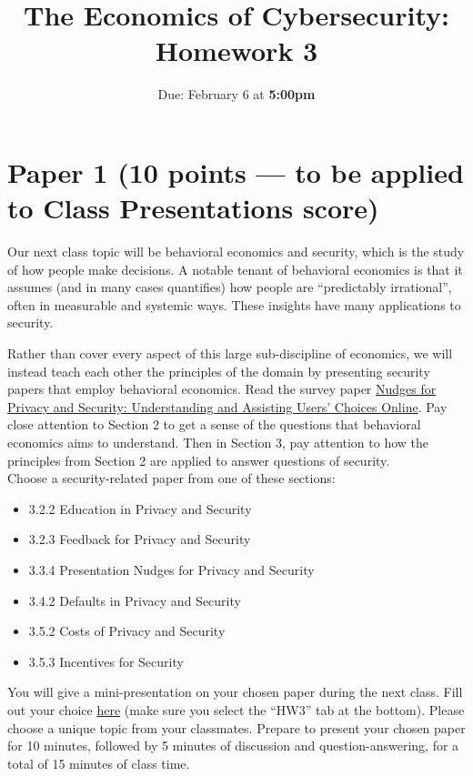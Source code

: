 \documentclass[11pt]{article}
\title{The Economics of Cybersecurity: Homework 3}
\date{Due: February 6 at {\bf 5:00pm}}
\author{}
\begin{document}
\maketitle


\section*{Paper 1 (10 points --- to be applied to Class Presentations score)}

Our next class topic will be behavioral economics and security, which is the study of how people make decisions. A notable tenant of behavioral economics is that it assumes (and in many cases quantifies) how people are ``predictably irrational'', often in measurable and systemic ways. These insights have many applications to security.

Rather than cover every aspect of this large sub-discipline of economics, we will instead teach each other the principles of the domain by presenting security papers that employ behavioral economics. Read the survey paper \href{https://dl.acm.org/doi/abs/10.1145/3054926}{Nudges for Privacy and Security: Understanding and Assisting Users' Choices Online}. Pay close attention to Section 2 to get a sense of the questions that behavioral economics aims to understand. Then in Section 3, pay attention to how the principles from Section 2 are applied to answer questions of security. 
\\ 

\noindent Choose a security-related paper from one of these sections:

\begin{itemize}
    \item 3.2.2 Education in Privacy and Security
    \item 3.2.3 Feedback for Privacy and Security
    \item 3.3.4 Presentation Nudges for Privacy and Security
    \item 3.4.2 Defaults in Privacy and Security
    \item 3.5.2 Costs of Privacy and Security
    \item 3.5.3 Incentives for Security
\end{itemize}


You will give a mini-presentation on your chosen paper during the next class. Fill out your choice \href{https://docs.google.com/spreadsheets/d/1SdaMpeCo4CE8o0U_irGhWmVXJYHybRWoiX4uwZYMhCE/edit?usp=sharing}{here} (make sure you select the ``HW3'' tab at the bottom). Please choose a unique topic from your classmates. Prepare to present your chosen paper for 10 minutes, followed by 5 minutes of discussion and question-answering, for a total of 15 minutes of class time.
\end{document}
